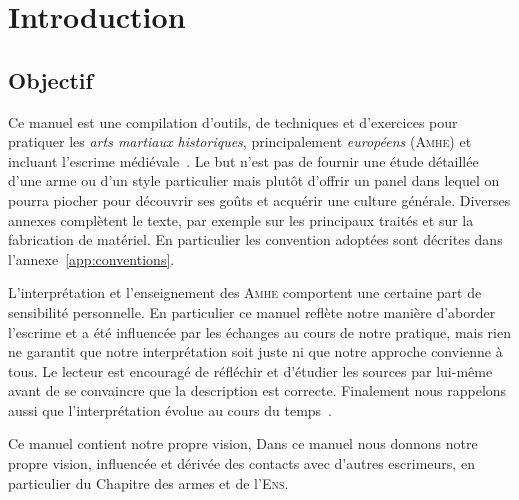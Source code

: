 \chapter{Introduction}


\section{Objectif}



Ce manuel est une compilation d'outils, de techniques et d'exercices pour pratiquer les \emph{arts martiaux historiques}, principalement \emph{européens} (\textsc{Amhe}) et incluant l'escrime médiévale~\footnotemark{}.
Le but n'est pas de fournir une étude détaillée d'une arme ou d'un style particulier mais plutôt d'offrir un panel dans lequel on pourra piocher pour découvrir ses goûts et acquérir une culture générale.
Diverses annexes complètent le texte, par exemple sur les principaux traités et sur la fabrication de matériel.
En particulier les convention adoptées sont décrites dans l'annexe~\ref{app:conventions}.

L'interprétation et l'enseignement des \textsc{Amhe} comportent une certaine part de sensibilité personnelle.
En particulier ce manuel reflète notre manière d'aborder l'escrime et a été influencée par les échanges au cours de notre pratique, mais rien ne garantit que notre interprétation soit juste ni que notre approche convienne à tous.
Le lecteur est encouragé de réfléchir et d'étudier les sources par lui-même avant de se convaincre que la description est correcte.
Finalement nous rappelons aussi que l'interprétation évolue au cours du temps~\footnotemark{}.

Ce manuel contient notre propre vision,
Dans ce manuel nous donnons notre propre vision, influencée et dérivée des contacts avec d'autres escrimeurs, en particulier du Chapitre des armes et de l'\textsc{Ens}.

